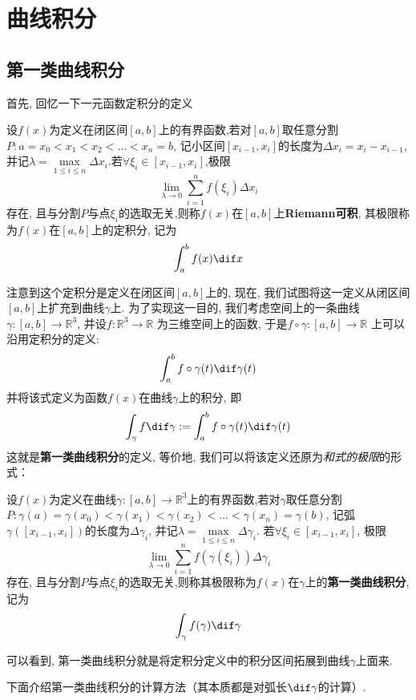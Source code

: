 
\section{曲线积分}


\subsection{第一类曲线积分}

首先, 回忆一下一元函数定积分的定义
\begin{definition}[定积分]
	设$f(x)$为定义在闭区间$[a,b]$上的有界函数,若对$[a,b]$取任意分割$P: a =x_0<x_1<x_2< \dots <x_n=b$,  记小区间$[x_{i-1},x_i]$的长度为$\Delta x_i = x_i-x_{i-1}$, 并记$\lambda = \max  \limits_{1\leq i\leq n} \Delta x_i$.若$\forall \xi_i\in [x_{i-1},x_i]$,极限
		$$\lim_{\lambda \rightarrow 0} \sum_{i=1}^n f(\xi_i) \Delta x_i$$
	存在, 且与分割$P$与点$\xi_i$的选取无关,则称$f(x)$在$[a,b]$上\textbf{Riemann可积}, 其极限称为$f(x)$在$[a,b]$上的定积分, 记为
		$$ \int_a^b f(x) \dif x$$
\end{definition}

	注意到这个定积分是定义在闭区间$[a,b]$上的, 现在, 我们试图将这一定义从闭区间$[a,b]$上扩充到曲线$\gamma$上. 为了实现这一目的, 我们考虑空间上的一条曲线$\gamma \colon [a,b] \rightarrow \mathbb{R}^3$, 并设$f\colon \mathbb{R}^3 \rightarrow \mathbb{R}$ 为三维空间上的函数, 于是$f \circ \gamma \colon [a,b]\rightarrow \mathbb{R}$ 上可以沿用定积分的定义:
		$$\int_a^b f \circ \gamma(t) \dif \gamma(t)$$
	并将该式定义为函数$f(x)$在曲线$\gamma$上的积分, 即
		$$\int_\gamma f \dif \gamma := \int_a^b f \circ \gamma(t) \dif \gamma(t)$$
	这就是\textbf{第一类曲线积分}的定义, 等价地, 我们可以将该定义还原为\emph{和式的极限}的形式：

	\begin{definition}[第一类曲线积分]
		设$f(x)$为定义在曲线$\gamma:[a,b]\rightarrow \mathbb{R}^3$上的有界函数,若对$\gamma$取任意分割$P: \gamma(a) =\gamma(x_0)<\gamma(x_1)<\gamma(x_2)< \dots <\gamma(x_n)=\gamma(b)$,  记弧$\gamma([x_{i-1},x_i])$的长度为$\Delta \gamma_i$, 并记$\lambda = \max  \limits_{1\leq i\leq n} \Delta \gamma_i $. 若$\forall \xi_i \in [x_{i-1},x_i]$, 极限
			$$\lim_{\lambda \rightarrow 0} \sum_{i=1}^n f(\gamma(\xi_i)) \Delta \gamma_i$$
		存在, 且与分割$P$与点$\xi_i$的选取无关,则称其极限称为$f(x)$在$\gamma$上的\textbf{第一类曲线积分}, 记为
			$$ \int_\gamma f(\gamma) \dif \gamma$$
	\end{definition}

	可以看到, 第一类曲线积分就是将定积分定义中的积分区间拓展到曲线$\gamma$上面来.\par
	下面介绍第一类曲线积分的计算方法（其本质都是对弧长$\dif\gamma$的计算）.

